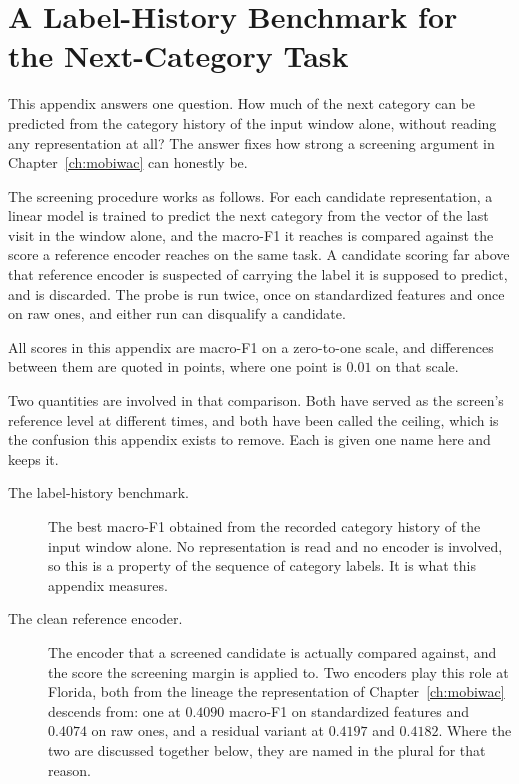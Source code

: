 
\chapter{A Label-History Benchmark for the Next-Category Task}
\label{apx:ceiling}

This appendix answers one question. How much of the next category can be predicted from the
category history of the input window alone, without reading any representation at all? The answer
fixes how strong a screening argument in Chapter~\ref{ch:mobiwac} can honestly be.

The screening procedure works as follows. For each candidate representation, a linear model is
trained to predict the next category from the vector of the last visit in the window alone, and the
macro-F1 it reaches is compared against the score a reference encoder reaches on the same task. A
candidate scoring far above that reference encoder is suspected of carrying the label it is supposed
to predict, and is discarded. The probe is run twice, once on standardized features and
once on raw ones, and either run can disqualify a candidate.

All scores in this appendix are macro-F1 on a zero-to-one scale, and differences between them are
quoted in points, where one point is $0.01$ on that scale.

Two quantities are involved in that comparison. Both have served as the screen's reference level
at different times, and both have been called the ceiling, which is the confusion this appendix
exists to remove. Each is given one name here and keeps it.

\begin{description}
  \item[The label-history benchmark.] The best macro-F1 obtained from the recorded category
        history of the input window alone. No representation is read and no encoder is involved,
        so this is a property of the sequence of category labels. It is what this appendix
        measures.
  \item[The clean reference encoder.] The encoder that a screened candidate is actually compared
        against, and the score the screening margin is applied to. Two encoders play this role at
        Florida, both from the lineage the representation of Chapter~\ref{ch:mobiwac} descends
        from: one at $0.4090$ macro-F1 on standardized features and $0.4074$ on raw ones, and a
        residual variant at $0.4197$ and $0.4182$. Where the two are discussed together below,
        they are named in the plural for that reason.
\end{description}

